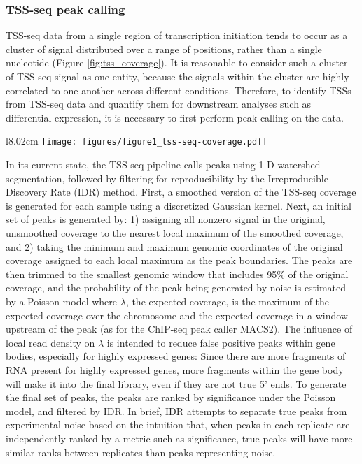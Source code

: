 \documentclass[10pt, letterpaper]{article}
\begin{document}
\subsubsection{TSS-seq peak calling}

TSS-seq data from a single region of transcription initiation tends to occur as a cluster of signal distributed over a range of positions, rather than a single nucleotide (Figure \ref{fig:tss_coverage}). It is reasonable to consider such a cluster of TSS-seq signal as one entity, because the signals within the cluster are highly correlated to one another across different conditions. Therefore, to identify TSSs from TSS-seq data and quantify them for downstream analyses such as differential expression, it is necessary to first perform peak-calling on the data.

\begin{wrapfigure}[13]{l}{8.02cm}
\centering
\texttt{[image: figures/figure1\_tss-seq-coverage.pdf]}
\caption{Wild-type sense strand TSS-seq signal at the TEF1 genic TSS. Normalized counts are the mean of spike-in normalized coverage from two replicates.}
\label{fig:tss_coverage}
\end{wrapfigure}

In its current state, the TSS-seq pipeline calls peaks using 1-D watershed segmentation, followed by filtering for reproducibility by the Irreproducible Discovery Rate (IDR) method. First, a smoothed version of the TSS-seq coverage is generated for each sample using a discretized Gaussian kernel. Next, an initial set of peaks is generated by: 1) assigning all nonzero signal in the original, unsmoothed coverage to the nearest local maximum of the smoothed coverage, and 2) taking the minimum and maximum genomic coordinates of the original coverage assigned to each local maximum as the peak boundaries. The peaks are then trimmed to the smallest genomic window that includes 95\% of the original coverage, and the probability of the peak being generated by noise is estimated by a Poisson model where $\lambda$, the expected coverage, is the maximum of the expected coverage over the chromosome and the expected coverage in a window upstream of the peak (as for the ChIP-seq peak caller MACS2). The influence of local read density on $\lambda$ is intended to reduce false positive peaks within gene bodies, especially for highly expressed genes: Since there are more fragments of RNA present for highly expressed genes, more fragments within the gene body will make it into the final library, even if they are not true 5' ends. To generate the final set of peaks, the peaks are ranked by significance under the Poisson model, and filtered by IDR. In brief, IDR attempts to separate true peaks from experimental noise based on the intuition that, when peaks in each replicate are independently ranked by a metric such as significance, true peaks will have more similar ranks between replicates than peaks representing noise.
\end{document}
